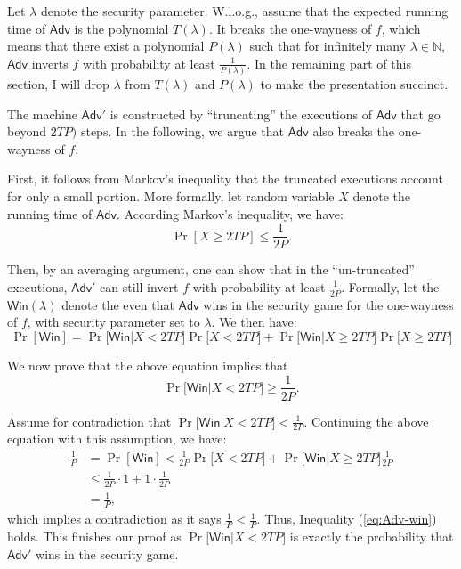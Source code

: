 \documentclass{article}
\newcommand{\Adv}{\mathsf{Adv}}
\newcommand{\Win}{\mathsf{Win}}
\begin{document}
Let $\lambda$ denote the security parameter.
W.l.o.g., assume that the expected running time of $\Adv$ is the polynomial $T(\lambda)$. It breaks the one-wayness of $f$, which means that there exist a polynomial $P(\lambda)$ such that for infinitely many $\lambda \in \mathbb{N}$, $\Adv$ inverts $f$ with probability at least $\frac{1}{P(\lambda)}$.  In the remaining part of this section, I will drop $\lambda$ from $T(\lambda)$ and $P(\lambda)$ to make the presentation succinct.

The machine $\Adv'$ is constructed by ``truncating'' the executions of $\Adv$ that go beyond $2TP)$ steps. In the following, we argue that $\Adv$ also breaks the one-wayness of $f$.

First, it follows from Markov's inequality that the truncated executions account for only a small portion. More formally, let random variable $X$ denote the running time of $\Adv$. According Markov's inequality, we have:
$$\Pr[X \ge 2TP] \le \frac{1}{2P}.$$ 

Then, by an averaging argument, one can show that in the ``un-truncated'' executions, $\Adv'$ can still invert $f$ with probability at least $\frac{1}{2P}$. Formally, let the $\Win(\lambda)$ denote the even that $\Adv$ wins in the security game for the one-wayness of $f$, with security parameter set to $\lambda$. We then have:
\begin{equation*}
  \Pr[\Win]  =  \Pr\big[\Win | X < 2TP\big] \Pr\big[X < 2TP \big]+ \Pr\big[\Win | X \ge 2TP \big] \Pr\big[X \ge 2TP\big] 
\end{equation*}

We now prove that the above equation implies that 
\begin{equation}\label{eq:Adv-win}
\Pr\big[\Win | X < 2TP\big] \ge \frac{1}{2P}.
\end{equation}

Assume for contradiction that $\Pr\big[\Win | X < 2TP\big] < \frac{1}{2P}$. Continuing the above equation with this assumption, we have:
\begin{align*}
  \frac{1}{P} & = \Pr[\Win]  <  \frac{1}{2P} \Pr\big[X < 2TP \big]+ \Pr\big[\Win | X \ge 2TP \big] \frac{1}{2P} \\ 
  & \le  \frac{1}{2P} \cdot 1 + 1 \cdot \frac{1}{2P} \\
  & =  \frac{1}{P},
\end{align*}
which implies a contradiction as it says $\frac{1}{P} < \frac{1}{P}$. Thus, Inequality (\ref{eq:Adv-win}) holds. This finishes our proof as $\Pr\big[\Win | X < 2TP\big]$ is exactly the probability that $\Adv'$ wins in the security game. 
\end{document}
